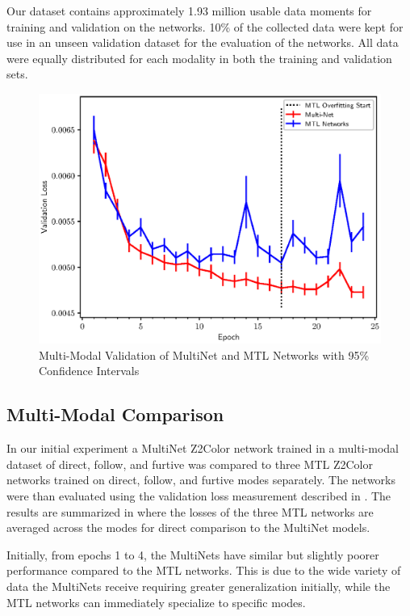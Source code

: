 Our dataset contains approximately 1.93 million usable data moments for training and validation on the networks. 10\% of the collected data were kept for use in an unseen validation dataset for the evaluation of the networks. All data were equally distributed for each modality in both the training and validation sets. 

\begin{figure}[t]
\centering
\includegraphics[width=\linewidth]{paper/content/images/mtl}
\caption{Multi-Modal Validation of MultiNet and MTL Networks with 95\% Confidence Intervals}
\label{fig:lve}
\end{figure}

\subsection{Multi-Modal Comparison}
In our initial experiment a MultiNet Z2Color network trained in a multi-modal dataset of direct, follow, and furtive was compared to three MTL Z2Color networks trained on direct, follow, and furtive modes separately. The networks were than evaluated using the validation loss measurement described in . The results are summarized in  where the losses of the three MTL networks are averaged across the modes for direct comparison to the MultiNet models.

Initially, from epochs 1 to 4, the MultiNets have similar but slightly poorer performance compared to the MTL networks. This is due to the wide variety of data the MultiNets receive requiring greater generalization initially, while the MTL networks can immediately specialize to specific modes.

